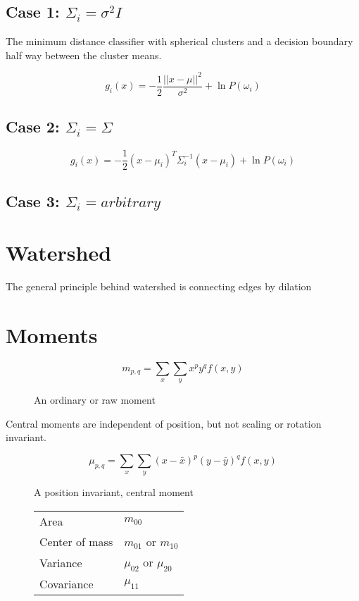 \documentclass[11pt]{report}
\begin{document}
\subsection*{Case 1: $\Sigma_i = \sigma^2I$}
The minimum distance classifier with spherical clusters and a decision boundary half way between the cluster means.

\begin{equation}
g_i(x) = -\frac{1}{2}\frac{||x-\mu||^2}{\sigma^2} + \ln P(\omega_i)
\end{equation}

\subsection*{Case 2: $\Sigma_i = \Sigma$}

\begin{equation}
g_i(x) = -\frac{1}{2}(x-\mu_i)^T\Sigma_i^{-1}(x-\mu_i) + \ln P(\omega_i)
\end{equation}

\subsection*{Case 3: $\Sigma_i = arbitrary$}

\section*{Watershed}
The general principle behind watershed is connecting edges by dilation

\section*{Moments}
\begin{figure}[!htb]
	\begin{equation}
		m_{p,q} = \sum_x{\sum_y{x^p y^q f(x,y)}}
	\end{equation}
	\caption{An ordinary or raw moment}
\end{figure}


Central moments are independent of position, but not scaling or rotation invariant.
\begin{figure}
\begin{equation}
\mu_{p,q}=\sum_x{\sum_y{(x-\bar{x})^p (y-\bar{y})^q f(x,y)}}
\end{equation}
\caption{A position invariant, central moment}
\end{figure}

\begin{figure}[!htb]
\begin{tabular}{ll}
    Area & $m_{00}$\\
	Center of mass & $m_{01}$ or $m_{10}$\\
	Variance & $\mu_{02}$ or $\mu_{20}$\\
	Covariance & $\mu_{11}$
\end{tabular}
\end{figure}
\end{document}
